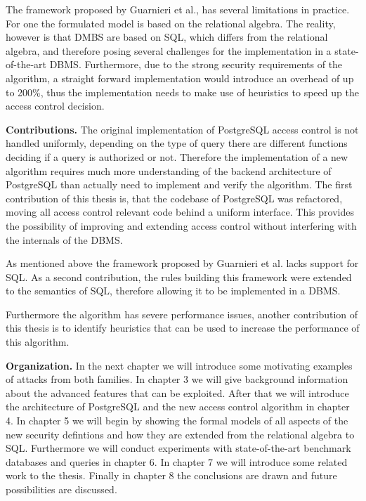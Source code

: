 The framework proposed by Guarnieri et al., has several limitations in practice.
%
For one the formulated model is based on the relational algebra. 
%
The reality, however is that DMBS are based on SQL, which differs from the relational algebra, and therefore posing several challenges for the implementation in a state-of-the-art DBMS.
%
Furthermore, due to the strong security requirements of the algorithm, a straight forward implementation would introduce an overhead of up to 200\%, thus the implementation needs to make use of heuristics to speed up the access control decision.
%



\smallskip
\noindent
{\bf Contributions.}
The original implementation of PostgreSQL access control is not handled uniformly, depending on the type of query there are different functions deciding if a query is authorized or not. 
%
Therefore the implementation of a new algorithm requires much more understanding of the backend architecture of PostgreSQL than actually need to implement and verify the algorithm.
%
The first contribution of this thesis is, that the codebase of PostgreSQL was refactored, moving all access control relevant code behind a uniform interface.
%
This provides the possibility of improving and extending access control without interfering with the internals of the DBMS.

As mentioned above the framework proposed by Guarnieri et al. lacks support for SQL. 
%
As a second contribution, the rules building this framework were extended to the semantics of SQL, therefore allowing it to be implemented in a DBMS.

Furthermore the algorithm has severe performance issues, another contribution of this thesis is to identify heuristics that can be used to increase the performance of this algorithm.
%


\smallskip
\noindent
{\bf Organization.}
%
In the next chapter we will introduce some motivating examples of attacks from both families. 
%
In chapter 3 we will give background information about the advanced features that can be exploited. 
%
After that we will introduce the architecture of PostgreSQL and the new access control algorithm in chapter 4. 
%
In chapter 5 we will begin by showing the formal models of all aspects of the new security defintions and how they are extended from the relational algebra to SQL. 
%
Furthermore we will conduct experiments with state-of-the-art benchmark databases and queries in chapter 6. 
%
In chapter 7 we will introduce some related work to the thesis. 
%
Finally in chapter 8 the conclusions are drawn and future possibilities are discussed.